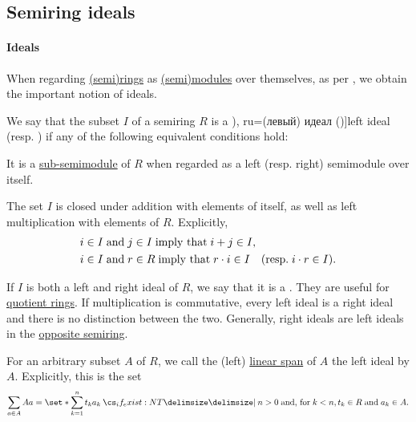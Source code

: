 \subsection{Semiring ideals}\label{subsec:semiring_ideals}

\paragraph{Ideals}

When regarding \hyperref[def:semiring]{(semi)rings} as \hyperref[def:semimodule]{(semi)modules} over themselves, as per , we obtain the important notion of ideals.

\begin{definition}\label{def:semiring_ideal}
  We say that the subset \( I \) of a semiring \( R \) is a \term[bg=(ляв) идеал (\cite[def. V.6]{ГеновМиховскиМоллов1991}), ru=(левый) идеал (\cite[def. 1.1.3]{ВечтомовПетров2022})]{left ideal} (resp. ) if any of the following equivalent conditions hold:
  \begin{thmenum}[series=def:semiring_ideal]
     It is a \hyperref[def:semimodule/submodel]{sub-semimodule} of \( R \) when regarded as a left (resp. right) semimodule over itself.

     The set \( I \) is closed under addition with elements of itself, as well as left multiplication with elements of \( R \). Explicitly,
    \begin{align}
      &i \in I \T{and} j \in I \T{imply that} i + j \in I, \label{eq:def:semiring_ideal/direct/additive} \\
      &i \in I \T{and} r \in R \T{imply that} r \cdot i \in I \quad (\T{resp.} i \cdot r \in I). \label{eq:def:semiring_ideal/direct/multiplicative}
    \end{align}
  \end{thmenum}

  If \( I \) is both a left and right ideal of \( R \), we say that it is a . They are useful for \hyperref[def:ring/quotient]{quotient rings}. If multiplication is commutative, every left ideal is a right ideal and there is no distinction between the two. Generally, right ideals are left ideals in the \hyperref[def:semiring/opposite]{opposite semiring}.

  \begin{thmenum}[resume=def:semiring_ideal]
     For an arbitrary subset \( A \) of \( R \), we call the (left) \hyperref[def:semimodule/submodel]{linear span} of \( A \) the left ideal  by \( A \). Explicitly, this is the set
    \begin{equation*}
      \sum_{a \in A} A a = \set*{ \sum_{k=1}^n t_k a_k \given* n > 0 \T{and, for} k < n, t_k \in R \T{and} a_k \in A }.
    \end{equation*}


\end{thmenum}
\end{definition}
